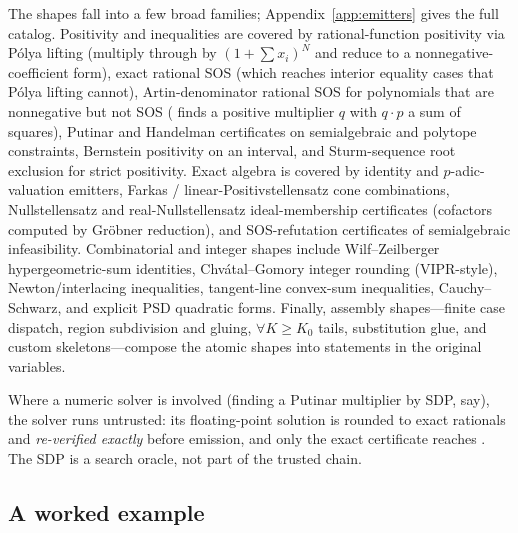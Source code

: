 The shapes fall into a few broad families; Appendix~\ref{app:emitters} gives the
full catalog. Positivity and inequalities are covered by rational-function
positivity via P\'olya lifting (multiply through by $(1+\sum x_i)^N$ and reduce to
a nonnegative-coefficient form), exact rational SOS (which reaches interior
equality cases that P\'olya lifting cannot), Artin-denominator rational SOS for
polynomials that are nonnegative but not SOS (\Telperion{} finds a positive
multiplier $q$ with $q\cdot p$ a sum of squares), Putinar and Handelman
certificates on semialgebraic and polytope constraints, Bernstein positivity on an
interval, and Sturm-sequence root exclusion for strict positivity. Exact algebra is
covered by identity and $p$-adic-valuation emitters, Farkas / linear-Positivstellensatz
cone combinations, Nullstellensatz and real-Nullstellensatz ideal-membership
certificates (cofactors computed by Gr\"obner reduction), and SOS-refutation
certificates of semialgebraic infeasibility. Combinatorial and integer shapes
include Wilf--Zeilberger hypergeometric-sum identities, Chv\'atal--Gomory integer
rounding (VIPR-style), Newton/interlacing inequalities, tangent-line convex-sum
inequalities, Cauchy--Schwarz, and explicit PSD quadratic forms. Finally, assembly
shapes---finite case dispatch, region subdivision and gluing, $\forall K \ge K_0$
tails, substitution glue, and custom skeletons---compose the atomic shapes into
statements in the original variables.

Where a numeric solver is involved (finding a Putinar multiplier by SDP, say), the
solver runs untrusted: its floating-point solution is rounded to exact rationals
and \emph{re-verified exactly} before emission, and only the exact certificate
reaches \Lean. The SDP is a search oracle, not part of the trusted chain.

\subsection{A worked example}
\label{sec:worked}

